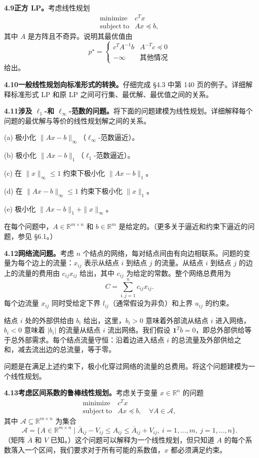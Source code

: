 \documentclass[UTF8,12pt,a4paper,fontset=fandol]{ctexart}
\begin{document}
\noindent\textbf{4.9\quad 正方 LP。}\quad 考虑线性规划
\[
\begin{array}{ll}
\mathop{\mathrm{minimize}} & c^Tx\\
\mathrm{subject\ to} & Ax\preceq b,
\end{array}
\]
其中 $A$ 是方阵且不奇异。说明其最优值由
\[
p^\star=
\begin{cases}
c^TA^{-1}b & A^{-T}c\preceq0\\
-\infty & \text{其他情况}
\end{cases}
\]
给出。

\noindent\textbf{4.10\quad 一般线性规划向标准形式的转换。}\quad 仔细完成 \S4.3 中第 140 页的例子。详细解释标准形式 LP 和原 LP 之间可行集、最优解、最优值之间的关系。

\noindent\textbf{4.11\quad 涉及 $\ell_1$-和 $\ell_\infty$-范数的问题。}\quad 将下面的问题建模为线性规划。详细解释每个问题的最优解与等价的线性规划解之间的关系。

(a) 极小化 $\|Ax-b\|_\infty$（$\ell_\infty$-范数逼近）。

(b) 极小化 $\|Ax-b\|_1$（$\ell_1$-范数逼近）。

(c) 在 $\|x\|_\infty\leq1$ 约束下极小化 $\|Ax-b\|_1$。

(d) 在 $\|Ax-b\|_\infty\leq1$ 约束下极小化 $\|x\|_1$。

(e) 极小化 $\|Ax-b\|_1+\|x\|_\infty$。

在每个问题中，$A\in\mathbb{R}^{m\times n}$ 和 $b\in\mathbb{R}^m$ 是给定的。（更多关于逼近和约束下逼近的问题，参见 \S6.1。）

\noindent\textbf{4.12\quad 网络流问题。}\quad 考虑 $n$ 个结点的网络，每对结点间由有向边相联系。问题的变量为每个边上的流量：$x_{ij}$ 表示从结点 $i$ 到结点 $j$ 的流量。从结点 $i$ 到结点 $j$ 的边上的流量的费用由 $c_{ij}x_{ij}$ 给出，其中 $c_{ij}$ 为给定的常数。整个网络总费用为
\[
C=\sum_{i,j=1}^n c_{ij}x_{ij}.
\]
每个边流量 $x_{ij}$ 同时受给定下界 $l_{ij}$（通常假设为非负）和上界 $u_{ij}$ 的约束。

结点 $i$ 处的外部供给由 $b_i$ 给出，这里，$b_i>0$ 意味着外部流从结点 $i$ 进入网络，$b_i<0$ 意味着 $|b_i|$ 的流量从结点 $i$ 流出网络。我们假设 $\mathbf{1}^Tb=0$，即总外部供给等于总外部需求。每个结点流量守恒：沿着边进入结点 $i$ 的总流量及外部供给之和，减去流出边的总流量，等于零。

问题是在满足上述约束下，极小化穿过网络的流量的总费用。将这个问题建模为一个线性规划。

\noindent\textbf{4.13\quad 考虑区间系数的鲁棒线性规划。}\quad 考虑关于变量 $x\in\mathbb{R}^n$ 的问题
\[
\begin{array}{ll}
\mathop{\mathrm{minimize}} & c^Tx\\
\mathrm{subject\ to} & Ax\preceq b,\quad \forall A\in\mathcal{A},
\end{array}
\]
其中 $\mathcal{A}\subseteq\mathbb{R}^{m\times n}$ 为集合
\[
\mathcal{A}=\{A\in\mathbb{R}^{m\times n}\mid \overline{A}_{ij}-V_{ij}\leq A_{ij}\leq\overline{A}_{ij}+V_{ij},\ i=1,\ldots,m,\ j=1,\ldots,n\}.
\]
（矩阵 $\overline{A}$ 和 $V$ 已知。）这个问题可以解释为一个线性规划，但只知道 $A$ 的每个系数落入一个区间，我们要求对于所有可能的系数值，$x$ 都必须满足约束。
\end{document}
